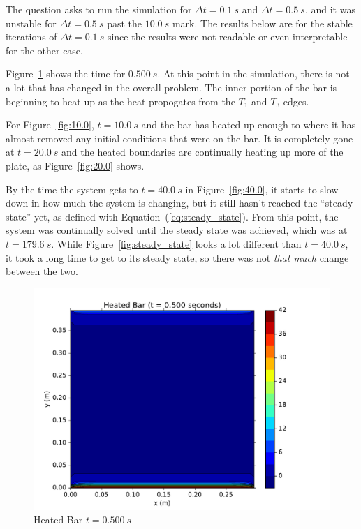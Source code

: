 \documentclass[addpoints]{exam}
\newcommand{\Dt}{\Delta t}
\begin{document}
\begin{questions}
\begin{solution}
The question asks to run the simulation for $\Dt = 0.1\ s$ and $\Dt = 0.5\ s$, and it was unstable for $\Dt = 0.5\ s$ past the $10.0\ s$ mark. The results below are for the stable iterations of $\Dt = 0.1\ s$ since the results were not readable or even interpretable for the other case.

Figure~\ref{fig:0.50} shows the time for $0.500\ s$. At this point in the simulation, there is not a lot that has changed in the overall problem. The inner portion of the bar is beginning to heat up as the heat propogates from the $T_{1}$ and $T_{3}$ edges. 

For Figure~\ref{fig:10.0}, $t = 10.0\ s$ and the bar has heated up enough to where it has almost removed any initial conditions that were on the bar. It is completely gone at $t = 20.0\ s$ and the heated boundaries are continually heating up more of the plate, as Figure~\ref{fig:20.0} shows. 

By the time the system gets to $t = 40.0\ s$ in Figure~\ref{fig:40.0}, it starts to slow down in how much the system is changing, but it still hasn't reached the ``steady state'' yet, as defined with Equation~(\ref{eq:steady_state}). From this point, the system was continually solved until the steady state was achieved, which was at $t = 179.6\ s$. While Figure~\ref{fig:steady_state} looks a lot different than $t = 40.0\ s$, it took a long time to get to its steady state, so there was not {\em that much} change between the two.


\begin{figure}[H]
\centering
\includegraphics[width=.8\linewidth]{figs/0-500_sec_heat-eq_colorplot.pdf}
\caption{Heated Bar $t=0.500\ s$}
\label{fig:0.50}
\end{figure}



\end{solution}
\end{questions}
\end{document}
